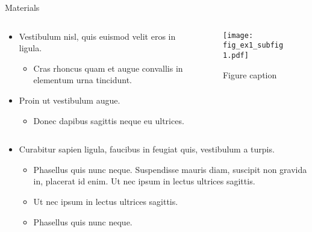 {\begin{block}{Materials}
	\begin{columns} %
		\begin{column}{.54\textwidth} %
			\begin{itemize}
				\item Vestibulum nisl, quis euismod velit eros in ligula.
				\begin{itemize}
					\item Cras rhoncus quam et augue convallis in elementum urna tincidunt.
				\end{itemize}
				\item Proin ut vestibulum augue.
				\begin{itemize}
					\item Donec dapibus sagittis neque eu ultrices.
				\end{itemize}
			\end{itemize}
		\end{column}
		
		\begin{column}{.43\textwidth} %
			\centering
			\begin{figure}
				\texttt{[image: fig\_ex1\_subfig1.pdf]}
				\caption{Figure caption}
			\end{figure}
		\end{column}
	\end{columns} %
	
	\begin{itemize}
		\item Curabitur sapien ligula, faucibus in feugiat quis, vestibulum a turpis.
		\begin{itemize}
			\item Phasellus quis nunc neque. Suspendisse mauris diam, suscipit non gravida in, placerat id enim. Ut nec ipsum in lectus ultrices sagittis.
			\item Ut nec ipsum in lectus ultrices sagittis.
			\item Phasellus quis nunc neque.
		\end{itemize}
	\end{itemize}
	
\end{block}
\vfill

}
